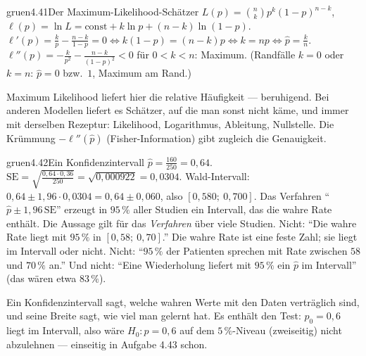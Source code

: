 \begin{loesungkarte}{gruen}{4.41}{Der Maximum-Likelihood-Schätzer}
$L(p) = \binom nkp^{k}(1 - p)^{n-k}$, $\ell(p) = \ln L = \text{const} + k\ln p + (n - k)\ln(1 - p)$.
$\ell'(p) = \frac kp - \frac{n - k}{1 - p} = 0\iff k(1 - p) = (n - k)p\iff k = np\iff\hat p = \frac kn$.
$\ell''(p) = -\frac k{p^{2}} - \frac{n - k}{(1 - p)^{2}} < 0$ für $0 < k < n$: Maximum. (Randfälle $k = 0$ oder $k = n$: $\hat p = 0$ bzw.\ $1$, Maximum am Rand.)
\begin{mitnehmen}\kastentext
Maximum Likelihood liefert hier die relative Häufigkeit --- beruhigend. Bei anderen Modellen liefert es Schätzer, auf die man sonst nicht käme, und immer mit derselben Rezeptur: Likelihood, Logarithmus, Ableitung, Nullstelle. Die Krümmung $-\ell''(\hat p)$ (Fisher-Information) gibt zugleich die Genauigkeit.
\end{mitnehmen}
\end{loesungkarte}

\begin{loesungkarte}{gruen}{4.42}{Ein Konfidenzintervall}
$\hat p = \frac{160}{250} = 0{,}64$. $\mathrm{SE} = \sqrt{\frac{0{,}64\cdot0{,}36}{250}} = \sqrt{0{,}000922} = 0{,}0304$. Wald-Intervall: $0{,}64\pm1{,}96\cdot0{,}0304 = 0{,}64\pm0{,}060$, also $[0{,}580;\ 0{,}700]$.
Das Verfahren \enquote{$\hat p\pm1{,}96\,\mathrm{SE}$} erzeugt in $95\,\%$ aller Studien ein Intervall, das die wahre Rate enthält. Die Aussage gilt für das \emph{Verfahren} über viele Studien.
Nicht: \enquote{Die wahre Rate liegt mit $95\,\%$ in $[0{,}58;\ 0{,}70]$.} Die wahre Rate ist eine feste Zahl; sie liegt im Intervall oder nicht. Nicht: \enquote{$95\,\%$ der Patienten sprechen mit Rate zwischen $58$ und $70\,\%$ an.} Und nicht: \enquote{Eine Wiederholung liefert mit $95\,\%$ ein $\hat p$ im Intervall} (das wären etwa $83\,\%$).
\begin{mitnehmen}\kastentext
Ein Konfidenzintervall sagt, welche wahren Werte mit den Daten verträglich sind, und seine Breite sagt, wie viel man gelernt hat. Es enthält den Test: $p_0 = 0{,}6$ liegt im Intervall, also wäre $H_0\colon p = 0{,}6$ auf dem $5\,\%$-Niveau (zweiseitig) nicht abzulehnen --- einseitig in Aufgabe 4.43 schon.
\end{mitnehmen}
\end{loesungkarte}

